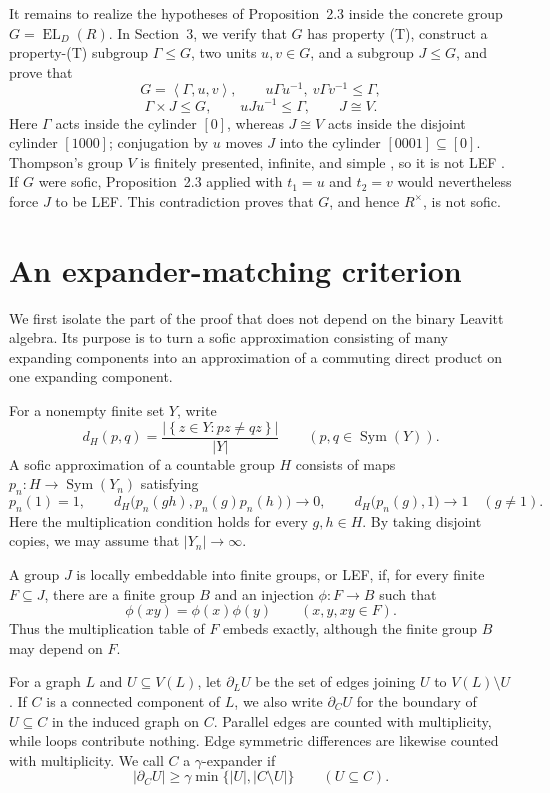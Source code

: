 \documentclass[10pt]{article}
\newcommand{\Sym}{\operatorname{Sym}}
\newcommand{\EL}{\operatorname{EL}}
\newcommand{\abs}[1]{\left|#1\right|}
\newcommand{\set}[1]{\left\{#1\right\}}
\newcommand{\angles}[1]{\left\langle #1\right\rangle}
\begin{document}
It remains to realize the hypotheses of Proposition~2.3 inside the concrete group $G=\EL_D(R)$. In Section~3, we verify that $G$ has property (T), construct a property-(T) subgroup $\Gamma\leq G$, two units $u,v\in G$, and a subgroup $J\leq G$, and prove that
\[
G=\angles{\Gamma,u,v},\qquad u\Gamma u^{-1},\ v\Gamma v^{-1}\leq\Gamma,
\]
\[
\Gamma\times J\leq G,\qquad uJu^{-1}\leq\Gamma,\qquad J\cong V.
\]
Here $\Gamma$ acts inside the cylinder $[0]$, whereas $J\cong V$ acts inside the disjoint cylinder $[1000]$; conjugation by $u$ moves $J$ into the cylinder $[0001]\subseteq[0]$. Thompson's group $V$ is finitely presented, infinite, and simple \cite{CFP96}, so it is not LEF \cite[Theorem~2.2]{VG97}. If $G$ were sofic, Proposition~2.3 applied with $t_1=u$ and $t_2=v$ would nevertheless force $J$ to be LEF. This contradiction proves that $G$, and hence $R^\times$, is not sofic.

\section{An expander-matching criterion}

We first isolate the part of the proof that does not depend on the binary Leavitt algebra. Its purpose is to turn a sofic approximation consisting of many expanding components into an approximation of a commuting direct product on one expanding component.

For a nonempty finite set $Y$, write
\[
d_H(p,q)=\frac{\abs{\set{z\in Y:pz\neq qz}}}{\abs{Y}}\qquad(p,q\in\Sym(Y)).
\]
A sofic approximation of a countable group $H$ consists of maps $p_n:H\to\Sym(Y_n)$ satisfying
\[
p_n(1)=1,\qquad d_H\bigl(p_n(gh),p_n(g)p_n(h)\bigr)\longrightarrow0,\qquad d_H\bigl(p_n(g),1\bigr)\longrightarrow1\quad(g\neq1).
\]
Here the multiplication condition holds for every $g,h\in H$. By taking disjoint copies, we may assume that $\abs{Y_n}\to\infty$.

A group $J$ is locally embeddable into finite groups, or LEF, if, for every finite $F\subseteq J$, there are a finite group $B$ and an injection $\phi:F\to B$ such that
\[
\phi(xy)=\phi(x)\phi(y)\qquad(x,y,xy\in F).
\]
Thus the multiplication table of $F$ embeds exactly, although the finite group $B$ may depend on $F$.

For a graph $L$ and $U\subseteq V(L)$, let $\partial_LU$ be the set of edges joining $U$ to $V(L)\setminus U$. If $C$ is a connected component of $L$, we also write $\partial_CU$ for the boundary of $U\subseteq C$ in the induced graph on $C$. Parallel edges are counted with multiplicity, while loops contribute nothing. Edge symmetric differences are likewise counted with multiplicity. We call $C$ a $\gamma$-expander if
\begin{equation}
\abs{\partial_CU}\geq\gamma\min\{\abs{U},\abs{C\setminus U}\}\qquad(U\subseteq C).
\tag{3}
\end{equation}
\end{document}
